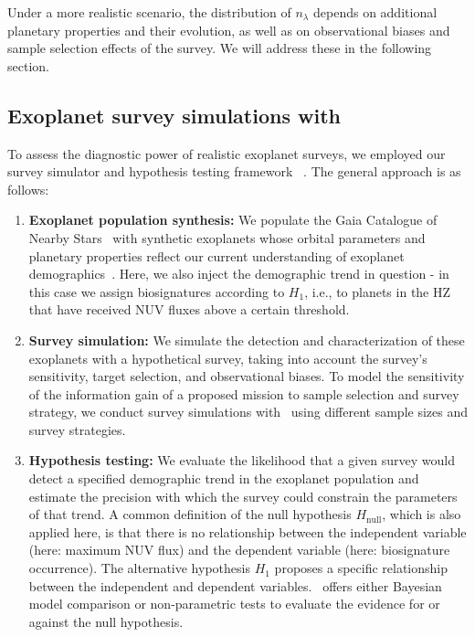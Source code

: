 \documentclass[twocolumn,twocolappendix,linenumbers]{aastex631}
\begin{document}
Under a more realistic scenario, the distribution of $n_{\lambda}$ depends on additional planetary properties and their evolution, as well as on observational biases and sample selection effects of the survey.
We will address these in the following section.


\subsection{Exoplanet survey simulations with \bioverse}
To assess the diagnostic power of realistic exoplanet surveys, we employed our survey simulator and hypothesis testing framework \bioverse~\citep{Bixel2021}.
The general approach is as follows:
\begin{enumerate}
\item \textbf{Exoplanet population synthesis:} We populate the Gaia Catalogue of Nearby Stars~\citep{Smart2021} with synthetic exoplanets whose orbital parameters and planetary properties reflect our current understanding of exoplanet demographics~\citep{Bergsten2022,Hardegree-Ullman2023}.
Here, we also inject the demographic trend in question - in this case we assign biosignatures according to $H_1$, i.e., to planets in the \gls{HZ} that have received \gls{NUV} fluxes above a certain threshold.
    \item \textbf{Survey simulation:} We simulate the detection and characterization of these exoplanets with a hypothetical survey, taking into account the survey's sensitivity, target selection, and observational biases.
To model the sensitivity of the information gain of a proposed mission to sample selection and survey strategy, we conduct survey simulations with \bioverse\ using different sample sizes and survey strategies.
    \item \textbf{Hypothesis testing:} We evaluate the likelihood that a given survey would detect a specified demographic trend in the exoplanet population and estimate the precision with which the survey could constrain the parameters of that trend.
    A common definition of the null hypothesis $H_\mathrm{null}$, which is also applied here, is that there is no relationship between the independent variable (here: maximum \gls{NUV} flux) and the dependent variable (here: biosignature occurrence).
    The alternative hypothesis $H_1$ proposes a specific relationship between the independent and dependent variables.
    \bioverse\ offers either Bayesian model comparison or non-parametric tests to evaluate the evidence for or against the null hypothesis.
\end{enumerate}
\end{document}
